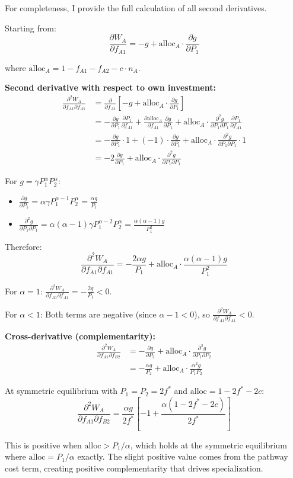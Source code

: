 \documentclass[11pt]{article}
\theoremstyle{definition}
\newcommand{\pd}[2]{\frac{\partial #1}{\partial #2}}
\newcommand{\pdd}[3]{\frac{\partial^2 #1}{\partial #2 \partial #3}}
\begin{document}
For completeness, I provide the full calculation of all second derivatives.

Starting from:
\begin{equation}
\pd{W_A}{f_{A1}} = -g + \text{alloc}_A \cdot \pd{g}{P_1}
\end{equation}

where $\text{alloc}_A = 1 - f_{A1} - f_{A2} - c \cdot n_A$.

\textbf{Second derivative with respect to own investment:}
\begin{align}
\pdd{W_A}{f_{A1}}{f_{A1}} &= \pd{}{f_{A1}}\left[-g + \text{alloc}_A \cdot \pd{g}{P_1}\right] \\
&= -\pd{g}{P_1}\pd{P_1}{f_{A1}} + \pd{\text{alloc}_A}{f_{A1}}\pd{g}{P_1} + \text{alloc}_A \cdot \pdd{g}{P_1}{P_1}\pd{P_1}{f_{A1}} \\
&= -\pd{g}{P_1} \cdot 1 + (-1) \cdot \pd{g}{P_1} + \text{alloc}_A \cdot \pdd{g}{P_1}{P_1} \cdot 1 \\
&= -2\pd{g}{P_1} + \text{alloc}_A \cdot \pdd{g}{P_1}{P_1}
\end{align}

For $g = \gamma P_1^\alpha P_2^\alpha$:
\begin{itemize}
\item $\pd{g}{P_1} = \alpha \gamma P_1^{\alpha-1} P_2^\alpha = \frac{\alpha g}{P_1}$
\item $\pdd{g}{P_1}{P_1} = \alpha(\alpha-1) \gamma P_1^{\alpha-2} P_2^\alpha = \frac{\alpha(\alpha-1)g}{P_1^2}$
\end{itemize}

Therefore:
\begin{equation}
\pdd{W_A}{f_{A1}}{f_{A1}} = -\frac{2\alpha g}{P_1} + \text{alloc}_A \cdot \frac{\alpha(\alpha-1)g}{P_1^2}
\end{equation}

For $\alpha = 1$: $\pdd{W_A}{f_{A1}}{f_{A1}} = -\frac{2g}{P_1} < 0$.

For $\alpha < 1$: Both terms are negative (since $\alpha - 1 < 0$), so $\pdd{W_A}{f_{A1}}{f_{A1}} < 0$.

\textbf{Cross-derivative (complementarity):}
\begin{align}
\pdd{W_A}{f_{A1}}{f_{B2}} &= -\pd{g}{P_2} + \text{alloc}_A \cdot \pdd{g}{P_1}{P_2} \\
&= -\frac{\alpha g}{P_2} + \text{alloc}_A \cdot \frac{\alpha^2 g}{P_1 P_2}
\end{align}

At symmetric equilibrium with $P_1 = P_2 = 2f^*$ and $\text{alloc} = 1 - 2f^* - 2c$:
\begin{equation}
\pdd{W_A}{f_{A1}}{f_{B2}} = \frac{\alpha g}{2f^*}\left[-1 + \frac{\alpha(1 - 2f^* - 2c)}{2f^*}\right]
\end{equation}

This is positive when $\text{alloc} > P_1/\alpha$, which holds at the symmetric equilibrium where $\text{alloc} = P_1/\alpha$ exactly. The slight positive value comes from the pathway cost term, creating positive complementarity that drives specialization.
\end{document}

